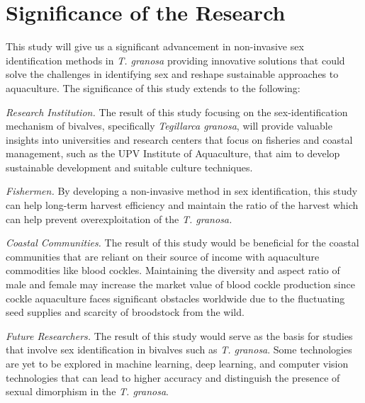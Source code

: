 \section{Significance of the Research}
\label{sec:significance}

This study will give us a significant advancement in non-invasive sex identification methods in \textit{T. granosa} providing innovative solutions that could solve the challenges in identifying sex and reshape sustainable approaches to aquaculture. The significance of this study extends to the following:

 \textit{Research Institution.} The result of this study focusing on the sex-identification mechanism of bivalves, specifically \textit{Tegillarca granosa}, will provide valuable insights into universities and research centers that focus on fisheries and coastal management, such as the UPV Institute of Aquaculture, that aim to develop sustainable development and suitable culture techniques.

 \textit{Fishermen.} By developing a non-invasive method in sex identification, this study can help long-term harvest efficiency and maintain the ratio of the harvest which can help prevent overexploitation of the \textit{T. granosa.}

 \textit{Coastal Communities.} The result of this study would be beneficial for the coastal communities that are reliant on their source of income with aquaculture commodities like blood cockles. Maintaining the diversity and aspect ratio of male and female may increase the market value of blood cockle production since cockle aquaculture faces significant obstacles worldwide due to the fluctuating seed supplies and scarcity of broodstock from the wild. 

 \textit{Future Researchers.} The result of this study would serve as the basis for studies that involve sex identification in bivalves such as \textit{T. granosa}. Some technologies are yet to be explored in machine learning, deep learning, and computer vision technologies that can lead to higher accuracy and distinguish the presence of sexual dimorphism in the \textit{T. granosa}.


